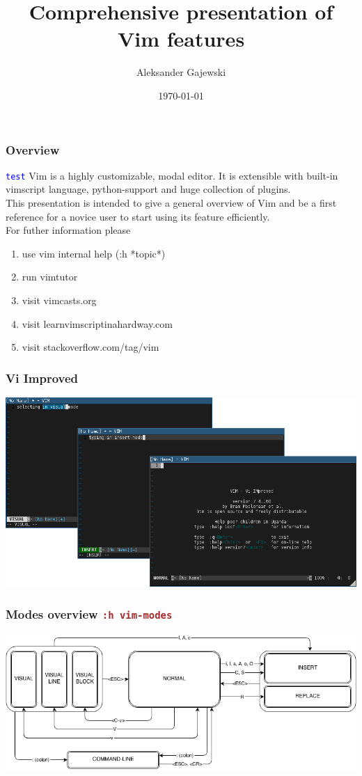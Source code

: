 \documentclass{beamer}
\title[Vim Intro]{Comprehensive presentation of Vim features} %
\author{Aleksander Gajewski} %
\institute[None] %
{
\textit{adiog@brainfuck.pl} %
}
\date{\today} %
\newcommand{\viminsert}[1]{\texttt{\textcolor{blue}{#1}}}
\newcommand{\vimcommand}[1]{\texttt{\textcolor{brown}{#1}}}
\newcommand{\vimhelp}[1]{\vimcommand{:h #1}}
\begin{document}
\begin{frame}
\titlepage %
\end{frame}

\begin{frame}
    \frametitle{Overview}
    \viminsert{test}
    Vim is a highly customizable, modal editor. It is extensible with built-in vimscript language, python-support and huge collection of plugins.\\
    This presentation is intended to give a general overview of Vim and be a first reference for a novice user to start using its feature efficiently.\\
    For futher information please
    \begin{enumerate} 
        \item use vim internal help (:h \textrm{*topic*})
        \item run vimtutor
        \item visit vimcasts.org
        \item visit learnvimscriptinahardway.com
        \item visit stackoverflow.com/tag/vim
    \end{enumerate}
\end{frame}

\begin{frame}[fragile]
    \frametitle{Vi Improved}
    \includegraphics[width=\textwidth]{vim_screen.png}
\end{frame}

\begin{frame}[fragile]
    \frametitle{Modes overview \vimhelp{vim-modes}}
    \includegraphics[width=\textwidth]{vim_modes.png}
\end{frame}
\end{document}
